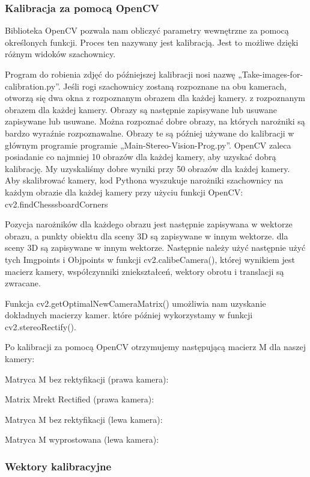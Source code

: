 \documentclass[magisterska]{pracadypl}
\begin{document}
\subsubsection{Kalibracja za pomocą OpenCV}

Biblioteka OpenCV pozwala nam obliczyć parametry wewnętrzne za pomocą określonych funkcji.
Proces ten nazywany jest kalibracją. Jest to możliwe dzięki różnym
widoków szachownicy.

Program do robienia zdjęć do późniejszej kalibracji nosi nazwę
„Take-images-for-calibration.py”.
Jeśli rogi szachownicy zostaną rozpoznane na obu kamerach, otworzą się dwa okna z rozpoznanym obrazem dla każdej kamery.
z rozpoznanym obrazem dla każdej kamery. Obrazy są następnie zapisywane lub usuwane
zapisywane lub usuwane. Można rozpoznać dobre obrazy, na których narożniki
są bardzo wyraźnie rozpoznawalne. Obrazy te są później używane do kalibracji w głównym programie
programie „Main-Stereo-Vision-Prog.py”. OpenCV zaleca posiadanie co najmniej 10
obrazów dla każdej kamery, aby uzyskać dobrą kalibrację. My uzyskaliśmy dobre wyniki przy 50
obrazów dla każdej kamery.
Aby skalibrować kamery, kod Pythona wyszukuje narożniki szachownicy na każdym
obrazie dla każdej kamery przy użyciu funkcji OpenCV: cv2.findChesssboardCorners

Pozycja narożników dla każdego obrazu jest następnie zapisywana w wektorze obrazu, a punkty obiektu dla sceny 3D są zapisywane w innym wektorze.
dla sceny 3D są zapisywane w innym wektorze. Następnie należy użyć
następnie użyć tych Imgpoints i Objpoints w funkcji cv2.calibeCamera(), której wynikiem jest
macierz kamery, współczynniki zniekształceń, wektory obrotu i translacji
są zwracane.

Funkcja cv2.getOptimalNewCameraMatrix() umożliwia nam uzyskanie dokładnych macierzy kamer.
które później wykorzystamy w funkcji cv2.stereoRectify().

Po kalibracji za pomocą OpenCV otrzymujemy następującą macierz M dla naszej kamery:

Matryca M bez rektyfikacji (prawa kamera):

Matrix Mrekt Rectified (prawa kamera):

Matryca M bez rektyfikacji (lewa kamera):

Matryca M wyprostowana (lewa kamera):

\subsubsection{Wektory kalibracyjne}
\end{document}
